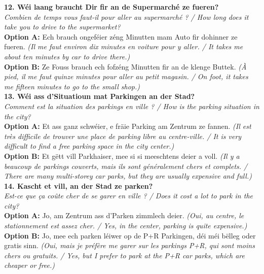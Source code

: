 \noindent\textbf{12. Wéi laang braucht Dir fir an de Supermarché ze fueren?}\\
\textit{Combien de temps vous faut-il pour aller au supermarché ? / How long does it take you to drive to the supermarket?}\\
\textbf{Option A:} Ech brauch ongeféier zéng Minutten mam Auto fir dohinner ze fueren. \textit{(Il me faut environ dix minutes en voiture pour y aller. / It takes me about ten minutes by car to drive there.)}\\
\textbf{Option B:} Ze Fouss brauch ech fofzéng Minutten fir an de klenge Buttek. \textit{(À pied, il me faut quinze minutes pour aller au petit magasin. / On foot, it takes me fifteen minutes to go to the small shop.)}\\[1em]

\noindent\textbf{13. Wéi ass d’Situatioun mat Parkingen an der Stad?}\\
\textit{Comment est la situation des parkings en ville ? / How is the parking situation in the city?}\\
\textbf{Option A:} Et ass ganz schwéier, e fräie Parking am Zentrum ze fannen. \textit{(Il est très difficile de trouver une place de parking libre au centre-ville. / It is very difficult to find a free parking space in the city center.)}\\
\textbf{Option B:} Et gëtt vill Parkhaiser, mee si si meeschtens deier a voll. \textit{(Il y a beaucoup de parkings couverts, mais ils sont généralement chers et complets. / There are many multi-storey car parks, but they are usually expensive and full.)}\\[1em]

\noindent\textbf{14. Kascht et vill, an der Stad ze parken?}\\
\textit{Est-ce que ça coûte cher de se garer en ville ? / Does it cost a lot to park in the city?}\\
\textbf{Option A:} Jo, am Zentrum ass d'Parken zimmlech deier. \textit{(Oui, au centre, le stationnement est assez cher. / Yes, in the center, parking is quite expensive.)}\\
\textbf{Option B:} Jo, mee ech parken léiwer op de P+R Parkingen, déi méi bëlleg oder gratis sinn. \textit{(Oui, mais je préfère me garer sur les parkings P+R, qui sont moins chers ou gratuits. / Yes, but I prefer to park at the P+R car parks, which are cheaper or free.)}\\[1em]

